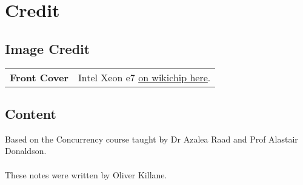\chapter{Credit}
\section*{Image Credit}
\begin{center}
    \begin{tabular}{r p{}}
        \textbf{Front Cover} & Intel Xeon e7 \href{https://en.wikichip.org/wiki/File:intel_xeon_e7_die_shot.jpg}{on wikichip here}. \\
    \end{tabular}
\end{center}

\section*{Content}
Based on the Concurrency course taught by Dr Azalea Raad and Prof Alastair Donaldson.
\\
\\ These notes were written by Oliver Killane.

